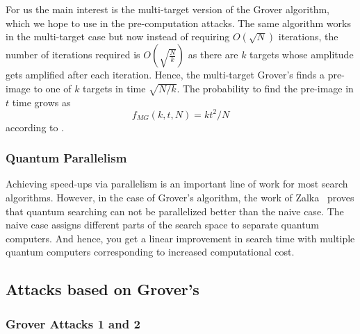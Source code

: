 For us the main interest is the multi-target version of the Grover algorithm, which we hope to use in the pre-computation attacks. The same algorithm works in the multi-target case but now instead of requiring $O(\sqrt{N})$ iterations, the number of iterations required is $O(\sqrt{\frac{N}{k}})$ as there are $k$ targets whose amplitude gets amplified after each iteration. %
Hence, the multi-target Grover's finds a pre-image  to one of $k$ targets in time $\sqrt{N/k}$. The probability to find the pre-image in $t$ time grows as 
\begin{equation}
    \label{eq:mt-grover}
    f_{MG}(k,t,N) = kt^2/N
\end{equation}according to \cite{Brassard_2002}.

\subsubsection{Quantum Parallelism}

Achieving speed-ups via parallelism is an important line of work for most search algorithms. However, in the case of Grover's algorithm, the work of Zalka~\cite{Zalka_1999} proves that quantum searching can not be parallelized better than the naive case. The naive case assigns different parts of the search space to separate quantum computers. And hence, you get a linear improvement in search time with multiple quantum computers corresponding to increased computational cost. 

\subsection{Attacks based on Grover's}

\subsubsection{Grover Attacks 1 and 2}

